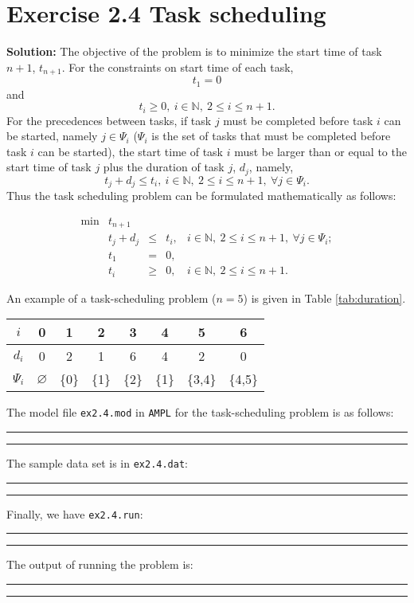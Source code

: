 \section{Exercise 2.4 Task scheduling}
\textbf{Solution:}
The objective of the problem is to minimize the start time of task $n+1$, $t_{n+1}$. For the constraints on start time of each task, $$t_1 = 0$$ and $$t_i \geq 0, ~i \in \mathbb{N}, ~2 \leq i \leq n+1.$$ For the precedences between tasks, if task $j$ must be completed before task $i$ can be started, namely $j \in \Psi_i$ ($\Psi_i$ is the set of tasks that must be completed before task $i$ can be started), the start time of task $i$ must be larger than or equal to the start time of task $j$ plus the duration of task $j$, $d_j$, namely, $$t_j + d_j \leq t_i,~i \in \mathbb{N}, ~2 \leq i \leq n+1,~\forall j \in \Psi_i.$$ Thus the task scheduling problem can be formulated mathematically as follows:

\[
\begin{array}{rrcll}
 \min & t_{n+1}  &  &   & \\
      &  t_j + d_j  &   \leq  & t_i, &i \in \mathbb{N}, ~2 \leq i \leq n+1,~\forall j \in \Psi_i; \\
      &  t_1 & = & 0, & \\
      &  t_i & \geq & 0, & i \in \mathbb{N}, ~2 \leq i \leq n+1.
\end{array}
\]

An example of a task-scheduling problem ($n=5$) is given in Table \ref{tab:duration}.

\begin{table*}[!h]
\centering
\small
\begin{tabular}{|c|c|c|c|c|c|c|c|}\hline

$i$ & 0 & 1 & 2 & 3 & 4 & 5 & 6  \\\hline
$d_i$ & 0 & 2 & 1 & 6 & 4 & 2 & 0 \\\hline
$\Psi_i$ & $\varnothing$ & \{0\} & \{1\} & \{2\} & \{1\} & \{3,4\} & \{4,5\} \\\hline
\end{tabular}
\caption{Duration of each task, and precedences between tasks}
\label{tab:duration}
\end{table*}

The model file {\tt ex2.4.mod} in {\tt AMPL} for the task-scheduling problem is as follows:

\bigskip
\hrule
\small

\normalsize
\hrule
\bigskip

The sample data set is in {\tt ex2.4.dat}:

\bigskip
\hrule
\small

\normalsize
\hrule
\bigskip

Finally, we have {\tt ex2.4.run}:

\bigskip
\hrule
\small

\normalsize
\hrule
\bigskip

The output of running the problem is:

\bigskip
\hrule
\small

\normalsize
\hrule
\bigskip

